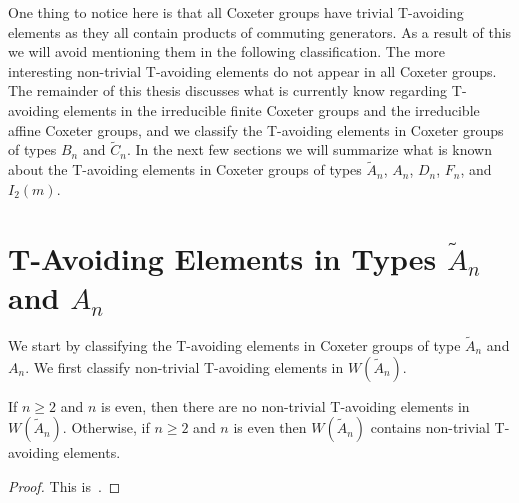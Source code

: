 One thing to notice here is that all Coxeter groups have trivial T-avoiding elements as they all contain products of commuting generators. As a result of this we will avoid mentioning them in the following classification. The more interesting non-trivial T-avoiding elements do not appear in all Coxeter groups. The remainder of this thesis discusses what is currently know regarding T-avoiding elements in the irreducible finite Coxeter groups and the irreducible affine Coxeter groups, and we classify the T-avoiding elements in Coxeter groups of types $B_n$ and $\widetilde{C}_n$. In the next few sections we will summarize what is known about the T-avoiding elements in Coxeter groups of types $\widetilde{A}_n$, $A_n$, $D_n$, $F_n$, and $I_2(m)$.



\section{T-Avoiding Elements in Types $\widetilde{A}_n$ and $A_n$}
We start by classifying the T-avoiding elements in Coxeter groups of type $\widetilde{A}_n$ and $A_n$. We first classify non-trivial T-avoiding elements in $W(\widetilde{A}_n)$.

\begin{theorem}
 If $n \geq 2$ and $n$ is even, then there are no non-trivial T-avoiding elements in $W(\widetilde{A}_n)$. Otherwise, if $n \geq 2$ and $n$ is even then $W(\widetilde{A}_n)$ contains non-trivial T-avoiding elements.
\begin{proof}
	This is~\cite[Proposition~3.1.2.]{Fan1999}.
\end{proof}
\end{theorem}



